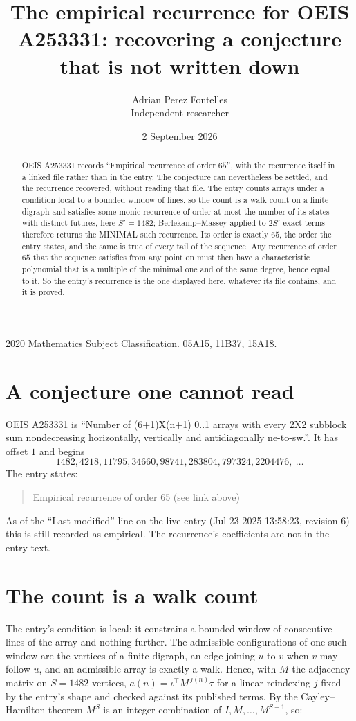 \documentclass[11pt,a4paper]{article}
\title{The empirical recurrence for OEIS A253331: recovering a conjecture that is not written down}
\author{Adrian Perez Fontelles\\ \small Independent researcher}
\date{2 September 2026}
\theoremstyle{plain}
\theoremstyle{definition}
\begin{document}
\maketitle

\begin{abstract}
OEIS A253331 records ``Empirical recurrence of order $65$'', with the recurrence itself in a
linked file rather than in the entry. The conjecture can nevertheless be settled, and the
recurrence recovered, without reading that file. The entry counts arrays under a condition
local to a bounded window of lines, so the count is a walk count on a finite digraph and
satisfies some monic recurrence of order at most the number of its states with distinct
futures, here $S'=1482$; Berlekamp--Massey applied to $2S'$ exact
terms therefore returns the MINIMAL such recurrence. Its order is exactly $65$, the order
the entry states, and the same is true of every tail of the sequence. Any recurrence of order
$65$ that the sequence satisfies from any point on must then have a characteristic
polynomial that is a multiple of the minimal one and of the same degree, hence equal to it. So
the entry's recurrence is the one displayed here, whatever its file contains, and it is
proved.
\end{abstract}

\noindent\small 2020 Mathematics Subject Classification. 05A15, 11B37, 15A18.\normalsize

\section{A conjecture one cannot read}

OEIS A253331 is ``Number of (6+1)X(n+1) 0..1 arrays with every 2X2 subblock sum nondecreasing horizontally, vertically and antidiagonally ne-to-sw.''. It has offset $1$ and begins
\[
1482, 4218, 11795, 34660, 98741, 283804, 797324, 2204476,\ \dots
\]
The entry states:
\begin{quote}
Empirical recurrence of order 65 (see link above)
\end{quote}
As of the ``Last modified'' line on the live entry (Jul 23 2025 13:58:23, revision 6) this is still
recorded as empirical. The recurrence's coefficients are not in the entry text.

\section{The count is a walk count}

The entry's condition is local: it constrains a bounded window of consecutive lines of the
array and nothing further. The admissible configurations of one such window are the vertices
of a finite digraph, an edge joining $u$ to $v$ when $v$ may follow $u$, and an admissible
array is exactly a walk. Hence, with $M$ the adjacency matrix on $S=1482$ vertices,
$a(n)=\iota^{\!\top}M^{\,j(n)}\tau$ for a linear reindexing $j$ fixed by the entry's shape
and checked against its published terms. By the Cayley--Hamilton theorem $M^{S}$ is an
integer combination of $I,M,\dots,M^{S-1}$, so:
\end{document}
